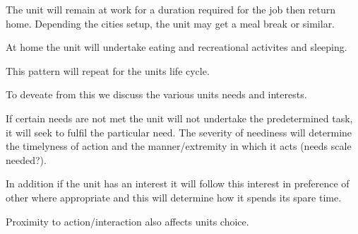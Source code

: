 The unit will remain at work for a duration required for the job then return home. Depending the cities setup, the unit may get a meal break or similar.

At home the unit will undertake eating and recreational activites and sleeping.

This pattern will repeat for the units life cycle.

To deveate from this we discuss the various units needs and interests. 

If certain needs are not met the unit will not undertake the predetermined task, it will seek to fulfil the particular need. The severity of neediness will determine the timelyness of action and the manner/extremity in which it acts (needs scale needed?).

In addition if the unit has an interest it will follow this interest in preference of other where appropriate and this will determine how it spends its spare time.

Proximity to action/interaction also affects units choice.




